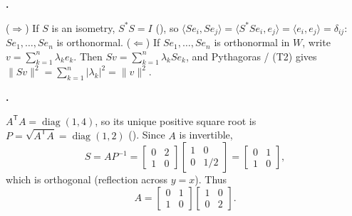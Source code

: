 \documentclass[10pt]{scrartcl}
\begin{document}
\begin{prob}
  \textbf{. }\par
  \begin{steps}
    \ii ($\Rightarrow$) If $S$ is an isometry, $S^*S=I$ (), so $\langle Se_i,Se_j\rangle=\langle S^*Se_i,e_j\rangle=\langle e_i,e_j\rangle=\delta_{ij}$: $Se_1,\dots,Se_n$ is orthonormal.
    \ii ($\Leftarrow$) If $Se_1,\dots,Se_n$ is orthonormal in $W$, write $v=\sum_{k=1}^n \lambda_k e_k$. Then $Sv=\sum_{k=1}^n \lambda_k Se_k$, and Pythagoras / (T2) gives $\|Sv\|^2=\sum_{k=1}^n |\lambda_k|^2 = \|v\|^2$.
  \end{steps}
\end{prob}

\begin{prob}
  \textbf{. }\par
  \begin{steps}
    \ii $A^{\mathsf T}A = \operatorname{diag}(1,4)$, so its unique positive square root is $P=\sqrt{A^{\mathsf T}A}=\operatorname{diag}(1,2)$ ().
    \ii Since $A$ is invertible,
    \[
      S = AP^{-1} = \begin{bmatrix}0&2\\1&0\end{bmatrix}\begin{bmatrix}1&0\\0&1/2\end{bmatrix} = \begin{bmatrix}0&1\\1&0\end{bmatrix},
    \]
    which is orthogonal (reflection across $y=x$). Thus
    \[ A = \begin{bmatrix}0&1\\1&0\end{bmatrix}\begin{bmatrix}1&0\\0&2\end{bmatrix}. \]
  \end{steps}
\end{prob}
\end{document}
